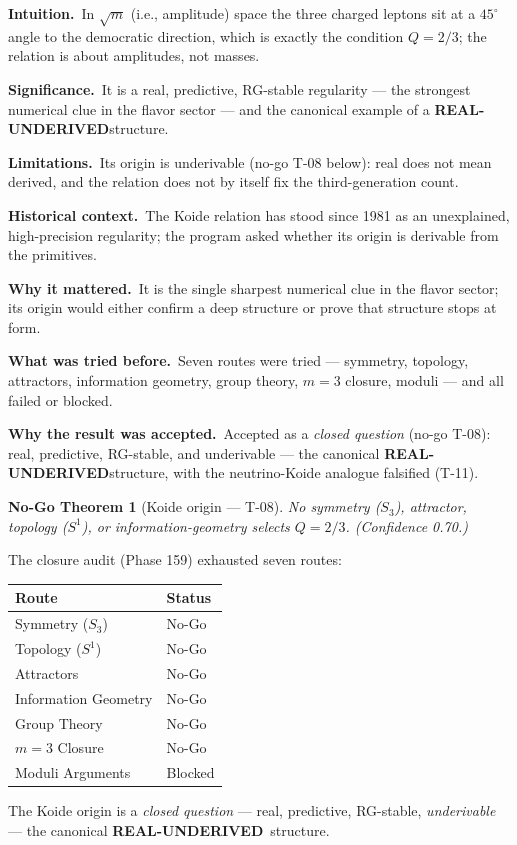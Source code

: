 \documentclass[10pt,twoside,openany]{book}
\newtheorem{nogo}[theorem]{No-Go Theorem}
\newcommand{\realunder}{\textbf{REAL-UNDERIVED}}
\newcommand{\theoremnotes}[3]{%
  \par\medskip\noindent
  \textbf{Intuition.}\ #1\par
  \textbf{Significance.}\ #2\par
  \textbf{Limitations.}\ #3\par}
\newcommand{\historynotes}[4]{%
  \par\smallskip\noindent
  \textbf{Historical context.}\ #1\par
  \textbf{Why it mattered.}\ #2\par
  \textbf{What was tried before.}\ #3\par
  \textbf{Why the result was accepted.}\ #4\par}
\begin{document}
\theoremnotes
{In $\sqrt m$ (i.e., amplitude) space the three charged leptons sit at a $45^\circ$ angle to
the democratic direction, which is exactly the condition $Q=2/3$; the relation is about
amplitudes, not masses.}
{It is a real, predictive, RG-stable regularity --- the strongest numerical clue in the
flavor sector --- and the canonical example of a \realunder structure.}
{Its origin is underivable (no-go T-08 below): real does not mean derived, and the relation
does not by itself fix the third-generation count.}

\historynotes
{The Koide relation has stood since 1981 as an unexplained, high-precision regularity; the
program asked whether its origin is derivable from the primitives.}
{It is the single sharpest numerical clue in the flavor sector; its origin would either
confirm a deep structure or prove that structure stops at form.}
{Seven routes were tried --- symmetry, topology, attractors, information geometry, group
theory, $m=3$ closure, moduli --- and all failed or blocked.}
{Accepted as a \emph{closed question} (no-go T-08): real, predictive, RG-stable, and
underivable --- the canonical \realunder structure, with the neutrino-Koide analogue
falsified (T-11).}

\begin{nogo}[Koide origin — T-08]
No symmetry ($S_3$), attractor, topology ($S^1$), or information-geometry selects $Q=2/3$.
(Confidence 0.70.)
\end{nogo}

The closure audit (Phase 159) exhausted seven routes:

\begin{center}
\begin{tabular}{ll}
\toprule
Route & Status \\
\midrule
Symmetry ($S_3$) & No-Go \\
Topology ($S^1$) & No-Go \\
Attractors & No-Go \\
Information Geometry & No-Go \\
Group Theory & No-Go \\
$m=3$ Closure & No-Go \\
Moduli Arguments & Blocked \\
\bottomrule
\end{tabular}
\end{center}

The Koide origin is a \emph{closed question} — real, predictive, RG-stable,
\emph{underivable} — the canonical \realunder\ structure.
\end{document}
